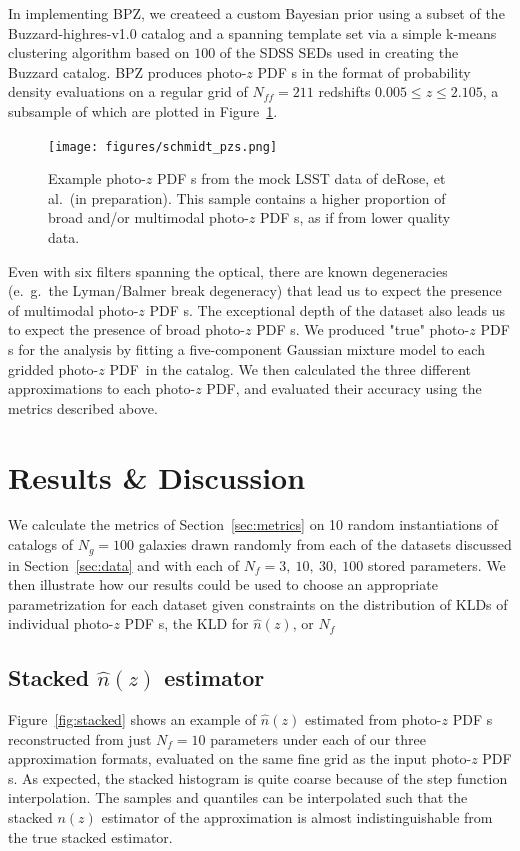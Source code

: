 \documentclass[\docopts]{\docclass}
\newcommand{\pz}{photo-$z$ PDF\xspace}
\begin{document}
In implementing BPZ, we createed a custom Bayesian prior using a subset of the 
Buzzard-highres-v1.0 catalog and a spanning template set via a simple k-means 
clustering algorithm based on $100$ of the SDSS SEDs used in creating the 
Buzzard catalog.
BPZ produces \pz s in the format of probability density evaluations on a 
regular grid of $N_{ff}=211$ redshifts $0.005\leq z\leq2.105$, a subsample of 
which are plotted in Figure~\ref{fig:schmidt_pzs}.

\begin{figure}
  \texttt{[image: figures/schmidt\_pzs.png]}
  \caption{Example \pz s from the mock LSST data of deRose, et al.\ (in 
preparation).
  This sample contains a higher proportion of broad and/or multimodal \pz s, as 
if from lower quality data.
  \label{fig:schmidt_pzs}}
\end{figure}

Even with six filters spanning the optical, there are known degeneracies 
(e.~g.~the Lyman/Balmer break degeneracy) that lead us to expect the presence 
of multimodal \pz s.
The exceptional depth of the dataset also leads us to expect the presence of 
broad \pz s.
We produced "true" \pz s for the analysis by fitting a five-component Gaussian 
mixture model to each gridded \pz\ in the catalog.
We then calculated the three different approximations to each \pz, and 
evaluated their accuracy using the metrics described above.


\section{Results \& Discussion}
\label{sec:results}


We calculate the metrics of Section~\ref{sec:metrics} on 10 random 
instantiations of catalogs of $N_{g}=100$ galaxies drawn randomly from each of 
the datasets discussed in Section~\ref{sec:data} and with each of $N_{f}=3,\ 
10,\ 30,\ 100$ stored parameters.
We then illustrate how our results could be used to choose an appropriate 
parametrization for each dataset given constraints on the distribution of KLDs 
of individual \pz s, the KLD for $\hat{n}(z)$, or $N_{f}$


\subsection{Stacked $\hat{n}(z)$ estimator}
\label{sec:stacked_results}

Figure~\ref{fig:stacked} shows an example of $\hat{n}(z)$ estimated from \pz s 
reconstructed from just $N_{f}=10$ parameters under each of our three 
approximation formats, evaluated on the same fine grid as the input \pz s.
As expected, the stacked histogram is quite coarse because of the step function 
interpolation.
The samples and quantiles can be interpolated such that the stacked $n(z)$ 
estimator of the approximation is almost indistinguishable from the true 
stacked estimator.
\end{document}
